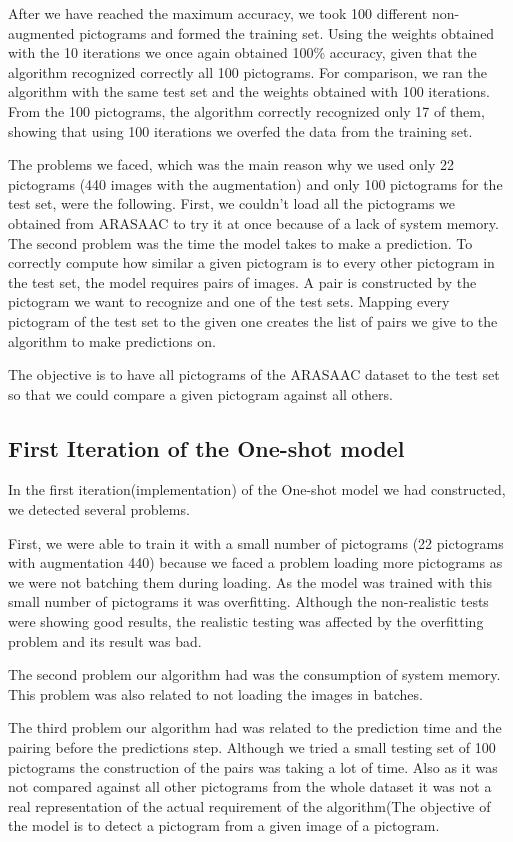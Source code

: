 After we have reached the maximum accuracy, we took 100 different non-augmented pictograms and formed the training set. Using the weights obtained with the 10 iterations we once again obtained 100\% accuracy, given that the algorithm recognized correctly all 100 pictograms. For comparison, we ran the algorithm with the same test set and the weights obtained with 100 iterations. From the 100 pictograms, the algorithm correctly recognized only 17 of them, showing that using 100 iterations we overfed the data from the training set.

The problems we faced, which was the main reason why we used only 22 pictograms (440 images with the augmentation) and only 100 pictograms for the test set, were the following. First, we couldn't load all the pictograms we obtained from ARASAAC to try it at once because of a lack of system memory. The second problem was the time the model takes to make a prediction. To correctly compute how similar a given pictogram is to every other pictogram in the test set, the model requires pairs of images. A pair is constructed by the pictogram we want to recognize and one of the test sets. Mapping every pictogram of the test set to the given one creates the list of pairs we give to the algorithm to make predictions on.

The objective is to have all pictograms of the ARASAAC dataset to the test set so that we could compare a given pictogram against all others.
\subsection{First Iteration of the One-shot model}
In the first iteration(implementation) of the One-shot model we had constructed, we detected several problems. 

First, we were able to train it with a small number of pictograms (22 pictograms with augmentation 440) because we faced a problem loading more pictograms as we were not batching them during loading. As the model was trained with this small number of pictograms it was overfitting. Although the non-realistic tests were showing good results, the realistic testing was affected by the overfitting problem and its result was bad.

The second problem our algorithm had was the consumption of system memory. This problem was also related to not loading the images in batches.

The third problem our algorithm had was related to the prediction time and the pairing before the predictions step. Although we tried a small testing set of 100 pictograms the construction of the pairs was taking a lot of time. Also as it was not compared against all other pictograms from the whole dataset it was not a real representation of the actual requirement of the algorithm(The objective of the model is to detect a pictogram from a given image of a pictogram.

